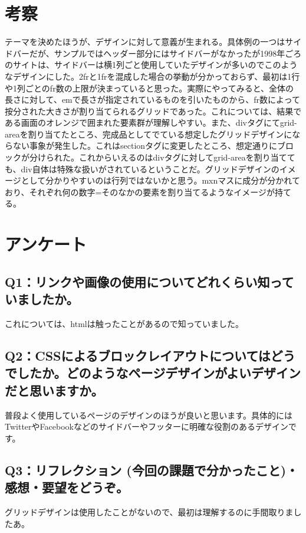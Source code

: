 \documentclass[12pt,a4j]{jarticle}
\begin{document}
\section{考察}

テーマを決めたほうが、デザインに対して意義が生まれる。具体例の一つはサイドバーだが、サンプルではヘッダー部分にはサイドバーがなかったが1998年ごろのサイトは、サイドバーは横1列ごと使用していたデザインが多いのでこのようなデザインにした。2frと1frを混成した場合の挙動が分かっておらず、最初は1行や1列ごとのfr数の上限が決まっていると思った。実際にやってみると、全体の長さに対して、emで長さが指定されているものを引いたものから、fr数によって按分された大きさが割り当てられるグリッドであった。これについては、結果である画面のオレンジで囲まれた要素群が理解しやすい。また、divタグにてgrid-areaを割り当てたところ、完成品としてでている想定したグリッドデザインにならない事象が発生した。これはsectionタグに変更したところ、想定通りにブロックが分けられた。これからいえるのはdivタグに対してgrid-areaを割り当てても、div自体は特殊な扱いがされているということだ。グリッドデザインのイメージとして分かりやすいのは行列ではないかと思う。mxnマスに成分が分かれており、それぞれ何の数字=そのなかの要素を割り当てるようなイメージが持てる。

\section{アンケート}

\subsection{Q1：リンクや画像の使用についてどれくらい知っていましたか。}
これについては、htmlは触ったことがあるので知っていました。

\subsection{Q2：CSSによるブロックレイアウトについてはどうでしたか。どのようなページデザインがよいデザインだと思いますか。}
普段よく使用しているページのデザインのほうが良いと思います。具体的にはTwitterやFacebookなどのサイドバーやフッターに明確な役割のあるデザインです。

\subsection{Q3：リフレクション (今回の課題で分かったこと)・感想・要望をどうぞ。}
グリッドデザインは使用したことがないので、最初は理解するのに手間取りましたあ。
\end{document}
